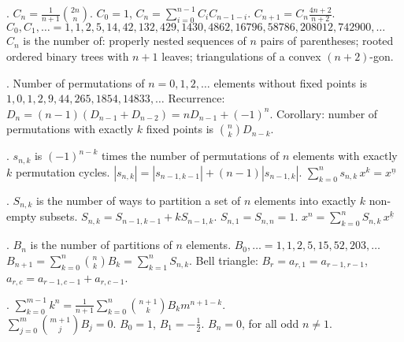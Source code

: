 .
$C_n = \frac{1}{n+1} {2n \choose n}$.
\quad $C_0=1$, $C_n=\sum_{i=0}^{n-1} C_i C_{n-1-i}$.
\quad $C_{n+1} = C_n \frac{4n+2}{n+2}$. \\
$C_0, C_1, \ldots = 1, 1, 2, 5, 14, 42, 132, 429, 1430, 4862, 16796,
		58786, 208012, 742900, \ldots$ \\
$C_n$ is the number of:
properly nested sequences of $n$ pairs of parentheses;
rooted ordered binary trees with $n+1$ leaves;
triangulations of a convex $(n+2)$-gon.

.
Number of permutations of $n=0,1,2,\dots$ elements without fixed points is
$1, 0, 1, 2, 9, 44, 265, 1854, 14833, \dots$
Recurrence: $D_n = (n-1)(D_{n-1} + D_{n-2}) = n D_{n-1} + (-1)^n$.
Corollary: number of permutations with exactly $k$ fixed points is ${n \choose k} D_{n-k}$.

.
$s_{n,k}$ is $(-1)^{n-k}$ times the number of permutations of $n$ elements with
exactly $k$ permutation cycles.
$|s_{n,k}| = |s_{n-1,k-1}| + (n-1) |s_{n-1,k}|$. \quad
$\sum_{k=0}^n s_{n,k}\,x^k = x^{\underline n}$


.
$S_{n,k}$ is the number of ways to partition a set of $n$ elements into
exactly $k$ non-empty subsets.
$S_{n,k} = S_{n-1,k-1} + k S_{n-1,k}$.
$S_{n,1} = S_{n,n} = 1$.
$x^n = \sum_{k=0}^n S_{n,k}\,x^{\underline k}$

.
$B_n$ is the number of partitions of $n$ elements.
$B_0, \ldots = 1,1,2,5,15,52,203,\ldots$ \\
$B_{n+1} = \sum_{k=0}^n {n \choose k} B_k = \sum_{k=1}^n S_{n,k}$.
Bell triangle: $B_r=a_{r,1}=a_{r-1,r-1}$, $a_{r,c}=a_{r-1,c-1}+a_{r,c-1}$.

.
$\sum_{k=0}^{m-1} k^n =
\frac{1}{n+1} \sum_{k=0}^n {n+1 \choose k} B_k m^{n+1-k}$. \\
$\sum_{j=0}^m {m+1 \choose j} B_j = 0$.
\quad $B_0=1$, $B_1=-\frac{1}{2}$. $B_n=0$, for all odd $n \ne 1$.

